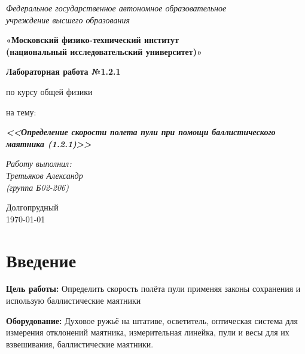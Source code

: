 




	
	\begin{center}
		\textit{Федеральное государственное автономное образовательное\\ учреждение высшего образования }
		
		\vspace{0.5ex}
		
		\textbf{«Московский физико-технический институт\\ (национальный исследовательский университет)»}
	\end{center}
	
	\vspace{10ex}
	
	
	\begin{center}
		\vspace{13ex}
		
		\textbf{Лабораторная работа №1.2.1}
		
		\vspace{1ex}
		
		по курсу общей физики
		
		на тему:
		
		\textbf{\textit{<<Определение скорости полета пули при помощи баллистического маятника (1.2.1)>>}}
		
		\vspace{30ex}
		
		\begin{flushright}
			\noindent
			\textit{Работу выполнил:}\\  
			\textit{Третьяков Александр \\(группа Б02-206)}
		\end{flushright}
		\vfill
		Долгопрудный \\ \today
		


	
	\section{Введение}
	
	\textbf{Цель работы:}
	Определить скорость полёта пули применяя законы сохранения и использую баллистические маятники
	
	\noindent\textbf{Оборудование:}
	Духовое ружьё на штативе, осветитель, оптическая система для измерения отклонений маятника, измерительная линейка, пули и весы для их взвешивания, баллистические маятники.

\end{center}
